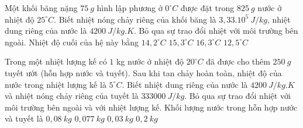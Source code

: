 	\begin{ex} 
	Một khối băng nặng $75 \ g$ hình lập phương ở $0^\circ C$ được đặt trong $825\ g$ nước ở nhiệt độ $25^\circ C$. Biết nhiệt nóng chảy riêng của khối băng là $3,33 . 10^{5} \ J /kg$, nhiệt dung riêng của nước là $4200\ J/kg.K$. Bỏ qua sự trao đổi nhiệt với môi trường bên ngoài. Nhiệt độ cuối của hệ này bằng  
	\choice
	{$14,2^\circ C$}
	{$15,3^\circ C$}
	{\True $16,3^\circ C$}
	{$12,5^\circ C$}
\end{ex}
\begin{ex} 
	Trong một nhiệt lượng kế có $1$ kg nước ở nhiệt độ $20^\circ C$ đã được cho thêm $250 \ g$ tuyết ướt (hỗn hợp nước và tuyết). Sau khi tan chảy hoàn toàn, nhiệt độ của nước trong nhiệt lượng kế là $5^\circ C$. Biết nhiệt dung riêng của nước là $4200\ J/kg.K$ và nhiệt nóng chảy riêng của tuyết là $333000 \ J /kg$. Bỏ qua sự trao đổi nhiệt với môi trường bên ngoài và với nhiệt lượng kế. Khối lượng nước trong hỗn hợp nước và tuyết là
	\choice
	{$0,08 \ kg$}
	{\True $0,077 \ kg$}
	{$0,03 \ kg$}
	{$0,2 \ kg$}
\end{ex}
